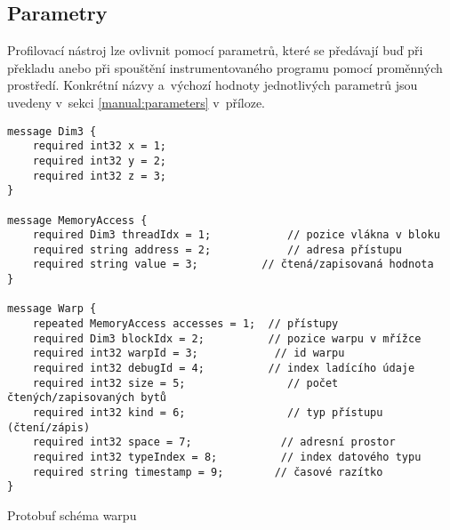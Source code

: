 \subsection{Parametry}
\label{sec:parameters}
Profilovací nástroj lze ovlivnit pomocí parametrů, které se předávají buď při překladu anebo při spouštění instrumentovaného programu pomocí proměnných prostředí. Konkrétní názvy a~výchozí hodnoty jednotlivých parametrů jsou uvedeny v~sekci \ref{manual:parameters} v~příloze.

\begin{listing}
\begin{verbatim}
message Dim3 {
	required int32 x = 1;
	required int32 y = 2;
	required int32 z = 3;
}

message MemoryAccess {
	required Dim3 threadIdx = 1;			// pozice vlákna v bloku
	required string address = 2;			// adresa přístupu
	required string value = 3;	  		// čtená/zapisovaná hodnota
}
	
message Warp {
	repeated MemoryAccess accesses = 1;	 // přístupy
	required Dim3 blockIdx = 2;			 // pozice warpu v mřížce
	required int32 warpId = 3;			  // id warpu
	required int32 debugId = 4;			 // index ladícího údaje
	required int32 size = 5;			    // počet čtených/zapisovaných bytů
	required int32 kind = 6;			    // typ přístupu (čtení/zápis)
	required int32 space = 7;			   // adresní prostor
	required int32 typeIndex = 8;		   // index datového typu
	required string timestamp = 9;		  // časové razítko
}
\end{verbatim}
\caption{Protobuf schéma warpu}
\label{code:protobufaccess}
\end{listing}

